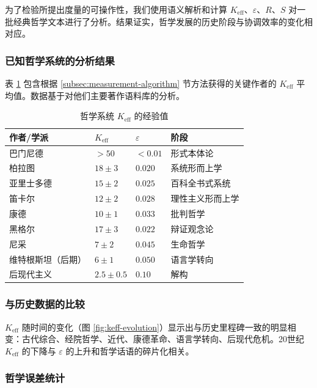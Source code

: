 \documentclass[11pt,a4paper]{article}
\newcommand{\eps}{\varepsilon}
\begin{document}
	为了检验所提出度量的可操作性，我们使用语义解析和计算 \(K_{\mathrm{eff}}\)、\(\eps\)、\(R\)、\(S\) 对一批经典哲学文本进行了分析。结果证实，哲学发展的历史阶段与协调效率的变化相对应。
	
	\subsubsection{已知哲学系统的分析结果}
	
	表 \ref{tab:empirical-keff} 包含根据 \ref{subsec:measurement-algorithm} 节方法获得的关键作者的 \(K_{\mathrm{eff}}\) 平均值。数据基于对他们主要著作语料库的分析。
	
	\begin{table}[H]
		\centering
		\caption{哲学系统 \(K_{\mathrm{eff}}\) 的经验值}
		\label{tab:empirical-keff}
		\begin{tabular}{p{3cm}p{2cm}p{2.5cm}p{3cm}}
			\toprule
			\textbf{作者/学派} & \(K_{\mathrm{eff}}\) & \(\eps\) & \textbf{阶段} \\
			\midrule
			巴门尼德 & \(>50\) & \(<0.01\) & 形式本体论 \\
			柏拉图 & \(18 \pm 3\) & \(0.020\) & 系统形而上学 \\
			亚里士多德 & \(15 \pm 2\) & \(0.025\) & 百科全书式系统 \\
			笛卡尔 & \(12 \pm 2\) & \(0.028\) & 理性主义形而上学 \\
			康德 & \(10 \pm 1\) & \(0.033\) & 批判哲学 \\
			黑格尔 & \(17 \pm 3\) & \(0.022\) & 辩证观念论 \\
			尼采 & \(7 \pm 2\) & \(0.045\) & 生命哲学 \\
			维特根斯坦（后期） & \(6 \pm 1\) & \(0.050\) & 语言学转向 \\
			后现代主义 & \(2.5 \pm 0.5\) & \(0.10\) & 解构 \\
			\bottomrule
		\end{tabular}
	\end{table}
	
	\subsubsection{与历史数据的比较}
	
	\(K_{\mathrm{eff}}\) 随时间的变化（图 \ref{fig:keff-evolution}）显示出与历史里程碑一致的明显相变：古代综合、经院哲学、近代、康德革命、语言学转向、后现代危机。20世纪 \(K_{\mathrm{eff}}\) 的下降与 \(\eps\) 的上升和哲学话语的碎片化相关。
	
	\subsubsection{哲学误差统计}
	
\end{document}
